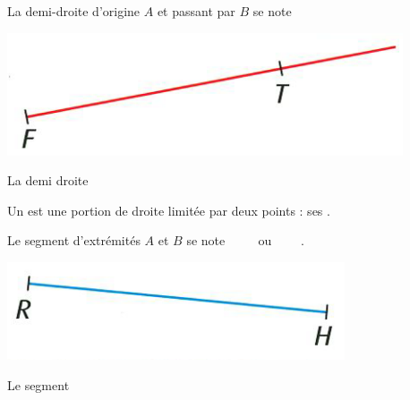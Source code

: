 \begin{myprop}
	La demi-droite d'origine $A$ et passant par $B$ se note 
\end{myprop}

\begin{myex}
	\begin{center}
		\includegraphics[scale=0.55]{img/demi-droite}
	\end{center}

	La demi droite 
\end{myex}

\begin{mydef}
	Un \hspace*{5cm} est une portion de droite limitée par deux points : ses \hspace*{5cm}.
\end{mydef}


\begin{myprop}
	Le segment d'extrémités $A$ et $B$ se note $\qquad$ ou $\qquad$.
\end{myprop}

\begin{myex}
	\begin{center}
		\includegraphics[scale=0.55]{img/segment}
	\end{center}
	
	Le segment 
\end{myex}